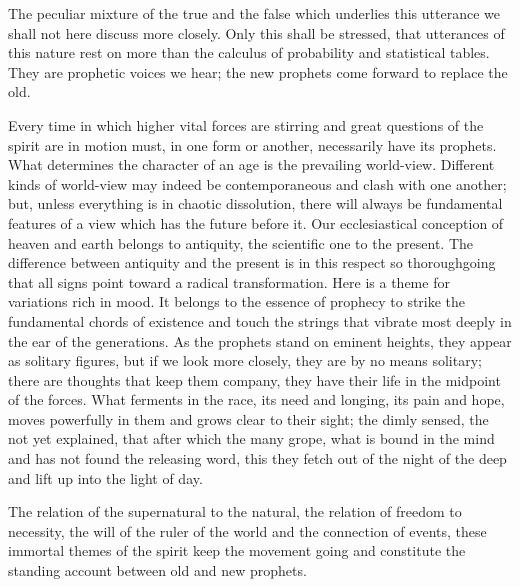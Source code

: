 \documentclass[12pt,a4paper,openany]{book}
\newcommand{\opage}[1]{\marginnote{\footnotesize\textit{[#1]}}}
\begin{document}
The peculiar mixture of the true and the false
which underlies this utterance we shall not here
discuss more closely. Only this shall be stressed, that utterances
of this nature rest on more than the calculus of probability
and statistical tables. They are prophetic
voices we hear; the new prophets come
forward to replace the old.

Every time in which higher vital forces are stirring and
great questions of the spirit are in motion must, in one
form or another, necessarily have its prophets. What
determines the character of an age is the prevailing
\setcounter{footnote}{0}%
\opage{7}world-view. Different kinds of world-view may indeed
be contemporaneous and clash with one another;
but, unless everything is in chaotic dissolution, there will always
be fundamental features of a view which has
the future before it. Our ecclesiastical conception of heaven
and earth belongs to antiquity, the scientific one to the present.
The difference between antiquity and the present is in this respect
so thoroughgoing that all signs point toward
a radical transformation. Here is a theme for variations rich
in mood. It belongs to the essence of prophecy
to strike the fundamental chords of existence and touch the strings
that vibrate most deeply in the ear of the generations. As the prophets
stand on eminent heights, they appear as solitary
figures, but if we look more closely, they are by no means
solitary; there are thoughts that keep them company, they have
their life in the midpoint of the forces. What ferments in
the race, its need and longing, its pain and hope,
moves powerfully in them and grows clear to their sight;
the dimly sensed, the not yet explained, that after which the many
grope, what is bound in the mind and has not found the
releasing word, this they fetch out of the night of the deep and lift
up into the light of day.

The relation of the supernatural to the natural, the relation of freedom
to necessity, the will of the ruler of the world
and the connection of events, these immortal
themes of the spirit keep the movement going and constitute
the standing account between old and new prophets.
\end{document}
